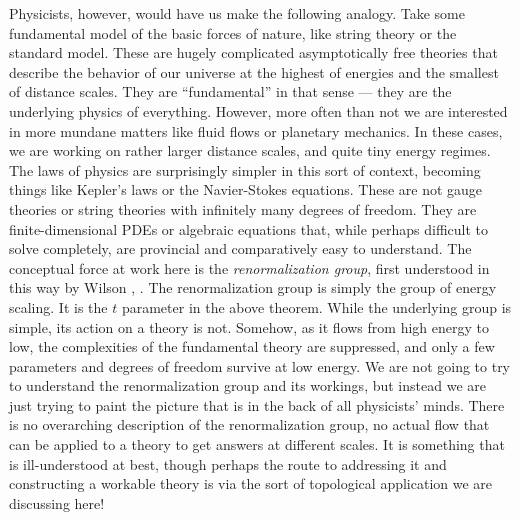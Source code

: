 \documentclass[twoside]{amsart}
\begin{document}
Physicists, however, would have us make the following analogy.  Take
some fundamental model of the basic forces of nature, like string
theory or the standard model.  These are hugely complicated
asymptotically free theories that describe the behavior of our
universe at the highest of energies and the smallest of distance
scales.  They are ``fundamental'' in that sense --- they are the
underlying physics of everything.  However, more often than not we are
interested in more mundane matters like fluid flows or planetary
mechanics.  In these cases, we are working on rather larger distance
scales, and quite tiny energy regimes.  The laws of physics are
surprisingly simpler in this sort of context, becoming things like
Kepler's laws or the Navier-Stokes equations.  These are not gauge
theories or string theories with infinitely many degrees of
freedom.  They are finite-dimensional PDEs or algebraic equations
that, while perhaps difficult to solve completely, are provincial and
comparatively easy to understand.  The conceptual force at work here
is the \emph{renormalization group}, first understood in this way by
Wilson \cite{wilson}, \cite{polchinski}.  The renormalization group is
simply the group of energy scaling.  It is the \( t \) parameter in
the above theorem.  While the underlying group is simple, its action
on a theory is not.  Somehow, as it flows from high energy to low, the
complexities of the fundamental theory are suppressed, and only a few
parameters and degrees of freedom survive at low energy.  We are not
going to try to understand the renormalization group and its workings,
but instead we are just trying to paint the picture that is in the
back of all physicists' minds.  There is no overarching description
of the renormalization group, no actual flow that can be applied to a
theory to get answers at different scales.  It is something that is
ill-understood at best, though perhaps the route to addressing it and
constructing a workable theory is via the sort of topological
application we are discussing here!
\end{document}
